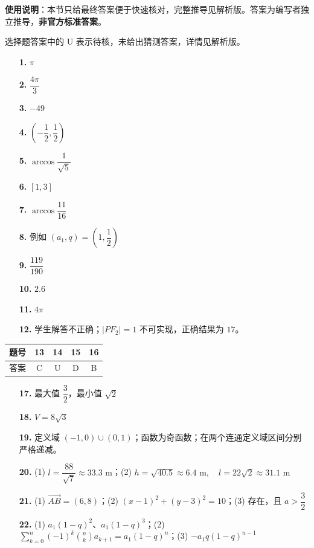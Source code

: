 
\begin{gknotice}
\textbf{使用说明}：本节只给最终答案便于快速核对，完整推导见解析版。答案为编写者独立推导，\textbf{非官方标准答案}。
\end{gknotice}

\begin{gknotice}
选择题答案中的 U 表示待核，未给出猜测答案，详情见解析版。
\end{gknotice}

\begin{itemize}[leftmargin=2.6em]
  \item[\textbf{1.}] \(\pi\)
  \item[\textbf{2.}] \(\dfrac{4\pi}{3}\)
  \item[\textbf{3.}] \(-49\)
  \item[\textbf{4.}] \(\left(-\dfrac12,\dfrac12\right)\)
  \item[\textbf{5.}] \(\arccos\dfrac1{\sqrt5}\)
  \item[\textbf{6.}] \([1,3]\)
  \item[\textbf{7.}] \(\arccos\dfrac{11}{16}\)
  \item[\textbf{8.}] 例如 \((a_1,q)=\left(1,\dfrac12\right)\)
  \item[\textbf{9.}] \(\dfrac{119}{190}\)
  \item[\textbf{10.}] \(2.6\)
  \item[\textbf{11.}] \(4\pi\)
  \item[\textbf{12.}] 学生解答不正确；\(|PF_2|=1\) 不可实现，正确结果为 \(17\)。
\end{itemize}

\begin{center}\begin{tabular}{ccccc}
\toprule
题号 & 13 & 14 & 15 & 16 \\
\midrule
答案 & C & U & D & B \\
\bottomrule
\end{tabular}\end{center}

\begin{itemize}[leftmargin=2.6em]
  \item[\textbf{17.}] 最大值 \(\dfrac32\)，最小值 \(\sqrt2\)
  \item[\textbf{18.}] \(V=8\sqrt3\)
  \item[\textbf{19.}] 定义域 \((-1,0)\cup(0,1)\)；函数为奇函数；在两个连通定义域区间分别严格递减。
  \item[\textbf{20.}] (1) \(l=\dfrac{88}{\sqrt7}\approx33.3\text{ m}\)；(2) \(h=\sqrt{40.5}\approx6.4\text{ m},\quad l=22\sqrt2\approx31.1\text{ m}\)
  \item[\textbf{21.}] (1) \(\overrightarrow{AB}=(6,8)\)；(2) \((x-1)^2+(y-3)^2=10\)；(3) 存在，且 \(a>\dfrac32\)
  \item[\textbf{22.}] (1) \(a_1(1-q)^2\)、\(a_1(1-q)^3\)；(2) \(\sum_{k=0}^n(-1)^k\binom nk a_{k+1}=a_1(1-q)^n\)；(3) \(-a_1q(1-q)^{n-1}\)
\end{itemize}
